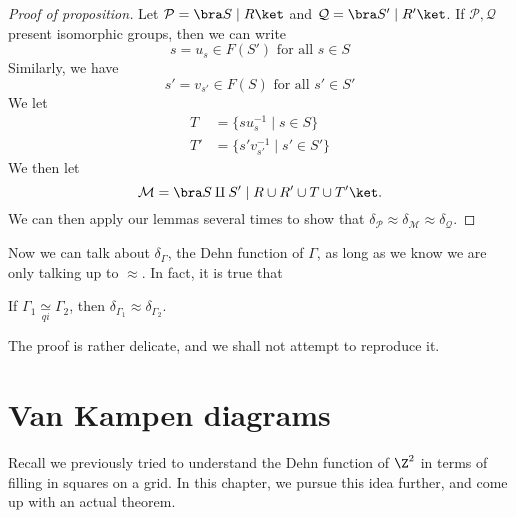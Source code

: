 \documentclass[a4paper]{article}
\newcommand{\qi}{\underset{qi}{\simeq}}
\begin{document}
\begin{proof}[Proof of proposition]
  Let $\mathcal{P} = \bra S \mid R \ket$ and $\mathcal{Q} = \bra S' \mid R'\ket$. If $\mathcal{P}, \mathcal{Q}$ present isomorphic groups, then we can write
  \[
    s = u_{s} \in F(S') \text{ for all }s \in S
  \]
  Similarly, we have
  \[
    s' = v_{s'} \in F(S)\text{ for all }s' \in S'
  \]
  We let
  \begin{align*}
    T &= \{s u_s^{-1} \mid s \in S\}\\
    T' &= \{s' v_{s'}^{-1} \mid s' \in S'\}
  \end{align*}
  We then let
  \[
    \mathcal{M} = \bra S \amalg S' \mid R \cup R' \cup T \cup T'\ket.
  \]
  We can then apply our lemmas several times to show that $\delta_{\mathcal{P}} \approx \delta_{\mathcal{M}} \approx \delta_{\mathcal{Q}}$.
\end{proof}

Now we can talk about $\delta_{\Gamma}$, the Dehn function of $\Gamma$, as long as we know we are only talking up to $\approx$. In fact, it is true that

\begin{fact}
  If $\Gamma_1 \qi \Gamma_2$, then $\delta_{\Gamma_1} \approx \delta_{\Gamma_2}$.
\end{fact}
The proof is rather delicate, and we shall not attempt to reproduce it.

\section{Van Kampen diagrams}
Recall we previously tried to understand the Dehn function of $\Z^2$ in terms of filling in squares on a grid. In this chapter, we pursue this idea further, and come up with an actual theorem.
\end{document}
